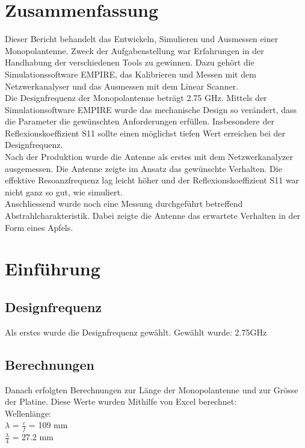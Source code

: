 

	\vspace*{15 mm}

\section{Zusammenfassung}

Dieser Bericht behandelt das Entwickeln, Simulieren und Ausmessen einer Monopolantenne. Zweck der Aufgabenstellung war Erfahrungen in der Handhabung der verschiedenen Tools zu gewinnen. Dazu gehört die Simulationssoftware EMPIRE, das Kalibrieren und Messen mit dem Netzwerkanalyser und das Ausmessen mit dem Linear Scanner.\\
Die Designfrequenz der Monopolantenne beträgt 2.75 GHz. Mittels der Simulationsoftware EMPIRE wurde das mechanische Design so verändert, dass die Parameter die gewünschten Anforderungen erfüllen. Insbesondere der Reflexionskoeffizient S11 sollte einen möglichst tiefen Wert erreichen bei der Designfrequenz.\\
Nach der Produktion wurde die Antenne als erstes mit dem Netzwerkanalyzer ausgemessen. Die Antenne zeigte im Ansatz das gewünschte Verhalten. Die effektive Resoanzfrequenz lag leicht höher und der Reflexionskoeffizient S11 war nicht ganz so gut, wie simuliert.\\
Anschliessend wurde noch eine Messung durchgeführt betreffend Abstrahlcharakteristik. Dabei zeigte die Antenne das erwartete Verhalten in der Form eines Apfels.

\newpage

\section{Einführung}



\subsection{Designfrequenz}
Als erstes wurde die Designfrequenz gewählt. Gewählt wurde: 2.75GHz\\

\subsection{Berechnungen}
Danach erfolgten Berechnungen zur Länge der Monopolantenne und zur Grösse der Platine. Diese Werte wurden Mithilfe von Excel berechnet:\\
\vspace{3mm}
Wellenlänge:\\
\vspace{3mm}
$\lambda$ = $\frac{c}{f}$ = 109 mm\\
$\frac{\lambda}{4}$ = 27.2 mm\\

